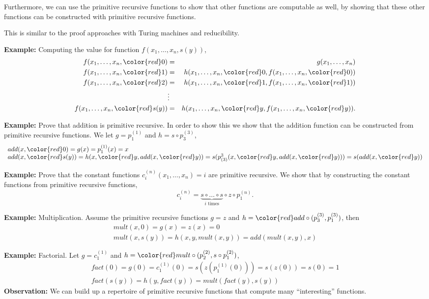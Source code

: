 \documentclass[a4paper,blends,pdf,colorBG,slideColor]{prosper}
\begin{document}
Furthermore, we can use the primitive recursive functions to show that other functions are computable as
well, by showing that these other functions can be constructed with primitive recursive functions.

This is similar to the proof approaches with Turing machines and reducibility.
\es

{\small

{\bf Example:} Computing the value for function $f(x_1,\ldots,x_n,s(y))$,
\begin{eqnarray*}
f(x_1,\ldots,x_n,{\color{red}0}) &=& g(x_1,\dots,x_n)\\
f(x_1,\ldots,x_n,{\color{red}1}) &=& h(x_1,\dots,x_n,{\color{red}0},f(x_1,\ldots,x_n,{\color{red}0}))\\
f(x_1,\ldots,x_n,{\color{red}2}) &=& h(x_1,\dots,x_n,{\color{red}1},f(x_1,\ldots,x_n,{\color{red}1}))\\
&\vdots&\\
f(x_1,\ldots,x_n,{\color{red}s(y)}) &=& h(x_1,\dots,x_n,{\color{red}y},f(x_1,\ldots,x_n,{\color{red}y})).
\end{eqnarray*}

{\bf Example:} Prove that addition is primitive recursive.  In order to show this we
show that the addition function can be constructed from primitive recursive functions.
 We let $g = p^{(1)}_1$ and $h = s \circ p^{(3)}_3$,
\[
\begin{array}{l}
    add(x,{\color{red}0})= g(x) = p^{(1)}_1(x) = x\\
    add(x,{\color{red}s(y)})= h(x,{\color{red}y},add(x,{\color{red}y})) = 
    		s(p_{(3)}^3(x,{\color{red}y},add(x,{\color{red}y}))) = s(add(x,{\color{red}y}))
\end{array}
\]
}
\es

{\small
{\bf Example:} Prove that the constant functions $c^{(n)}_i(x_1,\ldots,x_n) = i$ are primitive
recursive. We show that by constructing the constant functions from primitive recursive functions,
\[
c^{(n)}_i = \underbrace{s \circ \ldots \circ s}_{\mbox{$i$ times}} \circ z \circ p^{(n)}_1.
\]

{\bf Example:} Multiplication. Assume the primitive recursive functions $g = z$
and $h = {\color{red}add} \circ (p^{(3)}_3,p^{(3)}_1)$, then
\[
\begin{array}{l}
mult(x,0) = g(x) = z(x) = 0\\
mult(x,s(y)) = h(x,y,mult(x,y)) = add(mult(x,y),x)
\end{array}
\]

{\bf Example:} Factorial. Let $g = c^{(1)}_1$ and $h = {\color{red}mult} \circ (p^{(2)}_2, s \circ p^{(2)}_1)$,
\[
\begin{array}{l}
fact(0) = g(0) = c^{(1)}_1(0) = s (z (p^{(1)}_1(0))) = s(z(0)) = s(0) = 1\\
fact(s(y)) = h(y,fact(y)) = mult(fact(y),s(y))
\end{array}
\]
{\bf Observation:} We can build up a repertoire of primitive recursive functions
that compute many ``interesting'' functions.
}
\end{document}
